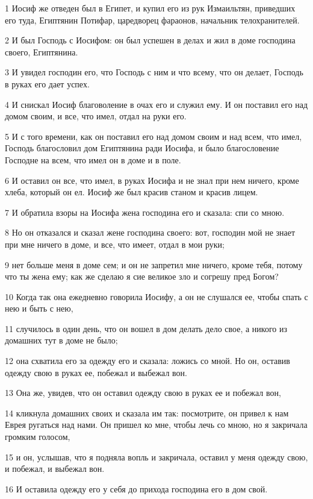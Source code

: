 \par 1 Иосиф же отведен был в Египет, и купил его из рук Измаильтян, приведших его туда, Египтянин Потифар, царедворец фараонов, начальник телохранителей.
\par 2 И был Господь с Иосифом: он был успешен в делах и жил в доме господина своего, Египтянина.
\par 3 И увидел господин его, что Господь с ним и что всему, что он делает, Господь в руках его дает успех.
\par 4 И снискал Иосиф благоволение в очах его и служил ему. И он поставил его над домом своим, и все, что имел, отдал на руки его.
\par 5 И с того времени, как он поставил его над домом своим и над всем, что имел, Господь благословил дом Египтянина ради Иосифа, и было благословение Господне на всем, что имел он в доме и в поле.
\par 6 И оставил он все, что имел, в руках Иосифа и не знал при нем ничего, кроме хлеба, который он ел. Иосиф же был красив станом и красив лицем.
\par 7 И обратила взоры на Иосифа жена господина его и сказала: спи со мною.
\par 8 Но он отказался и сказал жене господина своего: вот, господин мой не знает при мне ничего в доме, и все, что имеет, отдал в мои руки;
\par 9 нет больше меня в доме сем; и он не запретил мне ничего, кроме тебя, потому что ты жена ему; как же сделаю я сие великое зло и согрешу пред Богом?
\par 10 Когда так она ежедневно говорила Иосифу, а он не слушался ее, чтобы спать с нею и быть с нею,
\par 11 случилось в один день, что он вошел в дом делать дело свое, а никого из домашних тут в доме не было;
\par 12 она схватила его за одежду его и сказала: ложись со мной. Но он, оставив одежду свою в руках ее, побежал и выбежал вон.
\par 13 Она же, увидев, что он оставил одежду свою в руках ее и побежал вон,
\par 14 кликнула домашних своих и сказала им так: посмотрите, он привел к нам Еврея ругаться над нами. Он пришел ко мне, чтобы лечь со мною, но я закричала громким голосом,
\par 15 и он, услышав, что я подняла вопль и закричала, оставил у меня одежду свою, и побежал, и выбежал вон.
\par 16 И оставила одежду его у себя до прихода господина его в дом свой.
